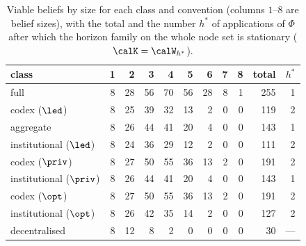 \begin{table}[H]
\centering\small
\caption{Viable beliefs by size for each class and convention (columns $1$--$8$ are belief sizes), with the total and the number $h^{\ast}$ of applications of $\Phi$ after which the horizon family on the whole node set is stationary ($\calK=\calW_{h^{\ast}}$).}
\label{tab:universe}
\begin{tabular}{lrrrrrrrrrr}
\toprule
class & 1 & 2 & 3 & 4 & 5 & 6 & 7 & 8 & total & $h^{\ast}$ \\
\midrule
full & 8 & 28 & 56 & 70 & 56 & 28 & 8 & 1 & 255 & 1 \\
codex ($\led$) & 8 & 25 & 39 & 32 & 13 & 2 & 0 & 0 & 119 & 2 \\
aggregate & 8 & 26 & 44 & 41 & 20 & 4 & 0 & 0 & 143 & 1 \\
institutional ($\led$) & 8 & 24 & 36 & 29 & 12 & 2 & 0 & 0 & 111 & 2 \\
codex ($\priv$) & 8 & 27 & 50 & 55 & 36 & 13 & 2 & 0 & 191 & 2 \\
institutional ($\priv$) & 8 & 26 & 44 & 41 & 20 & 4 & 0 & 0 & 143 & 1 \\
codex ($\opt$) & 8 & 27 & 50 & 55 & 36 & 13 & 2 & 0 & 191 & 2 \\
institutional ($\opt$) & 8 & 26 & 42 & 35 & 14 & 2 & 0 & 0 & 127 & 2 \\
decentralised & 8 & 12 & 8 & 2 & 0 & 0 & 0 & 0 & 30 & --- \\
\bottomrule
\end{tabular}
\end{table}
